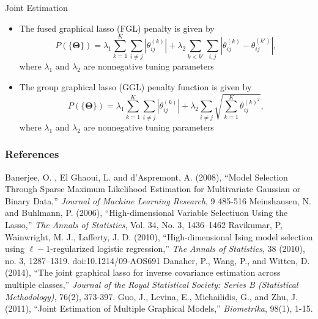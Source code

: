 \documentclass[xcolor=dvipsnames,aspectratio=1610]{beamer}
\theoremstyle{remark}
\begin{document}
\begin{frame}{Joint Estimation}
  \begin{itemize}
    \setlength{\itemsep}{10pt}

\item The fused graphical lasso (FGL) penalty is given by
\small
\begin{equation*}
P(\{\bm{\Theta}\}) = \lambda_{1}\sum_{k=1}^{K}\sum_{i\neq j}|\theta_{ij}^{(k)}| + \lambda_{2}\sum_{k<k'}\sum_{i,j}|\theta_{ij}^{(k)}-\theta_{ij}^{(k')}|,
\end{equation*}
\normalsize
where $\lambda_{1}$ and $\lambda_{2}$ are nonnegative tuning parameters

\item The group graphical lasso (GGL) penalty function is given by
\small
\begin{equation*}
P(\{\bm{\Theta}\}) = \lambda_{1}\sum_{k=1}^{K}\sum_{i\neq j}|\theta_{ij}^{(k)}| + \lambda_{2}\sum_{i\neq j}\sqrt{\sum_{k=1}^{K}\theta_{ij}^{(k)^{2}}},
\end{equation*}
\normalsize
where $\lambda_{1}$ and $\lambda_{2}$ are nonnegative tuning parameters    
 
 \end{itemize}
\end{frame}

\begin{frame}
\frametitle{References}
\small
\begin{block}{}
\begin{thebibliography}{Tototo}
 Banerjee, O. , El Ghaoui, L. and  d’Aspremont, A.  (2008), {``Model Selection Through Sparse Maximum Likelihood Estimation
for Multivariate Gaussian or Binary Data,''} \emph{Journal of Machine Learning Research}, 9  485-516
  Meinshausen, N. and Buhlmann, P. (2006), {``High-dimensional Variable Selectiuon Using the Lasso,''} \emph{The Annals of Statistics}, Vol. 34, No. 3, 1436–1462
  Ravikumar, P, Wainwright, M. J., Lafferty, J. D. (2010), {``High-dimensional Ising model selection using $\ell-1$-regularized logistic regression,''} \emph{The Annals of Statistics}, 38 (2010), no. 3, 1287--1319. doi:10.1214/09-AOS691
 Danaher, P., Wang, P., and Witten, D. (2014), {``The joint graphical lasso for inverse covariance estimation across multiple classes,''} \emph{Journal of the Royal Statistical Society: Series B (Statistical Methodology)}, 76(2), 373-397.
 Guo, J., Levina, E., Michailidis, G., and Zhu, J. (2011), {``Joint Estimation of Multiple Graphical Models,''} \emph{Biometrika}, 98(1), 1-15. 
\end{thebibliography}
\end{block}
\end{frame}
\end{document}
